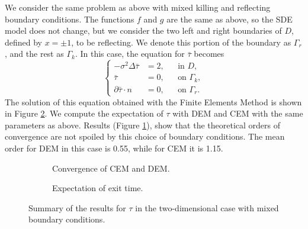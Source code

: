 We consider the same problem as above with mixed killing and reflecting boundary conditions. The functions $f$ and $g$ are the same as above, so the SDE model does not change, but we consider the two left and right boundaries of $D$, defined by $x = \pm 1$, to be reflecting. We denote this portion of the boundary as $\Gamma_r$, and the rest as $\Gamma_k$. In this case, the equation for $\bar\tau$ becomes
\begin{equation}\label{eq:PDETau2DKilling}
	\left \{
  	\begin{aligned}
	- \sigma^2 \Delta \bar \tau &= 2, && \text{in } D, \\
	\bar \tau &= 0, && \text{on } \Gamma_k, \\
	\partial \bar \tau \cdot n &= 0, && \text{on } \Gamma_r.
	\end{aligned} \right.
\end{equation}
The solution of this equation obtained with the Finite Elements Method is shown in Figure \ref{fig:TauExact2DRefl}. We compute the expectation of $\tau$ with DEM and CEM with the same parameters as above. Results (Figure \ref{fig:ReflTwoD}), show that the theoretical orders of convergence are not spoiled by this choice of boundary conditions. The mean order for DEM in this case is 0.55, while for CEM it is 1.15.


\begin{figure}[t]
    \centering
    \begin{subfigure}{0.49\linewidth}
        \centering
        \resizebox{1\linewidth}{!}{ }  
        \caption{Convergence of CEM and DEM.}
        \label{fig:ReflTwoD}
    \end{subfigure}
    \begin{subfigure}{0.49\linewidth}
        \centering
        \resizebox{1\linewidth}{!}{ }  
        \caption{Expectation of exit time.}
        \label{fig:TauExact2DRefl}
    \end{subfigure}    
    \caption{Summary of the results for $\tau$ in the two-dimensional case with mixed boundary conditions.}
    \label{fig:OrdersTwoDRefl}
\end{figure}
